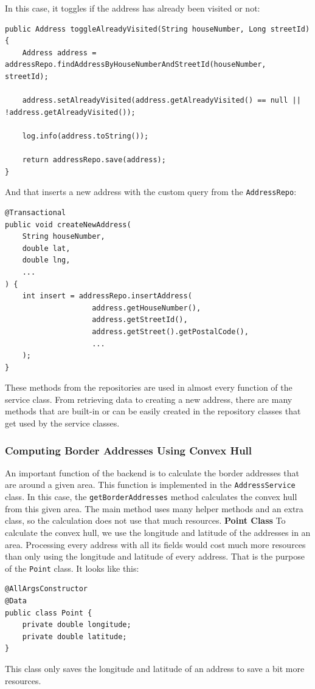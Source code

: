     In this case, it toggles if the address has already been visited or not:
    \lstset{style=java, caption=Toggle Already Visited}
    \begin{verbatim}
public Address toggleAlreadyVisited(String houseNumber, Long streetId) {
    Address address = addressRepo.findAddressByHouseNumberAndStreetId(houseNumber, streetId);
    
    address.setAlreadyVisited(address.getAlreadyVisited() == null || !address.getAlreadyVisited());
    
    log.info(address.toString());
    
    return addressRepo.save(address);
}
    \end{verbatim}

    And that inserts a new address with the custom query from the \texttt{AddressRepo}: 
    \lstset{style=java, caption=Insert new Address}
    \begin{verbatim}
@Transactional
public void createNewAddress(
    String houseNumber,
    double lat,
    double lng,
    ...
) {
    int insert = addressRepo.insertAddress(
                    address.getHouseNumber(),
                    address.getStreetId(),
                    address.getStreet().getPostalCode(),
                    ...
    );
}    
    \end{verbatim}

    These methods from the repositories are used in almost every function of the service class. From retrieving data to creating a new address, there are many methods that are built-in or can be easily created in the repository classes that get used by the service classes.

    \subsubsection{Computing Border Addresses Using Convex Hull}
    An important function of the backend is to calculate the border addresses that are around a given area. This function is implemented in the \texttt{AddressService} class. In this case, the \texttt{getBorderAddresses} method calculates the convex hull from this given area. The main method uses many helper methods and an extra class, so the calculation does not use that much resources. \newline
    \textbf{Point Class} \newline
    To calculate the convex hull, we use the longitude and latitude of the addresses in an area. Processing every address with all its fields would cost much more resources than only using the longitude and latitude of every address. That is the purpose of the \texttt{Point} class. It looks like this: 
    \lstset{style=java, caption=Point Class}
    \begin{verbatim}
@AllArgsConstructor
@Data
public class Point {
    private double longitude;
    private double latitude;
}
    \end{verbatim}
    This class only saves the longitude and latitude of an address to save a bit more resources. \newline

